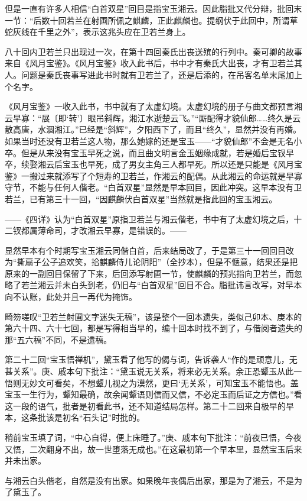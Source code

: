 \par 但是一直有许多人相信“白首双星”回目是指宝玉湘云。因此脂批又代分辩，批回末一节：“后数十回若兰在射圃所佩之麒麟，正此麒麟也。提纲伏于此回中，所谓草蛇灰线在千里之外”，表示这兆头应在卫若兰身上。
\par 八十回内卫若兰只出现过一次，在第十四回秦氏出丧送殡的行列中。秦可卿的故事来自《风月宝鉴》。《风月宝鉴》收入此书后，书中才有秦氏大出丧，才有卫若兰其人。问题是秦氏丧事写进此书时就有卫若兰了，还是后添的，在吊客名单末尾加上个名字。
\par 《风月宝鉴》一收入此书，书中就有了太虚幻境。太虚幻境的册子与曲文都预言湘云早寡：“展〔即‘转’〕眼吊斜辉，湘江水逝楚云飞。”“厮配得才貌仙郎……终久是云散高唐，水涸湘江。”已经是“斜辉”，夕阳西下了，而且“终久”，显然并没有再婚。如果当时还没有卫若兰这人物，那么她嫁的还是宝玉——“才貌仙郎”不会是无名小卒。但是从来没有宝玉早死之说，而且曲文明言金玉姻缘成就，若是婚后宝钗早卒，续娶湘云后宝玉也早死，成了男女主角三人都早死。所以还是只能是《风月宝鉴》一搬过来就添写了个短寿的卫若兰，作湘云的配偶。从此湘云的命运就是早寡守节，不能与任何人偕老。“白首双星”显然是早本回目，因此冲突。这早本没有卫若兰，已有第三十一回，“因麒麟伏白首双星”当然就是指此回的宝玉湘云。
\par ——《四详》认为“白首双星”原指卫若兰与湘云偕老，书中有了太虚幻境之后，十二钗都属薄命司，才改湘云早寡，是错误的。——
\par 显然早本有个时期写宝玉湘云同偕白首，后来结局改了，于是第三十一回回目改为“撕扇子公子追欢笑，拾麒麟侍儿论阴阳”（全抄本），但是不惬意，结果还是把原来的一副回目保留了下来，后回添写射圃一节，使麒麟的预兆指向卫若兰，而忽略了若兰湘云并未白头到老，仍旧与“白首双星”回目不合。脂批讳言改写，对早本向不认账，此处并且一再代为掩饰。
\par 畸笏嗟叹“卫若兰射圃文字迷失无稿”，该是整个一回本遗失，类似己卯本、庚本的第六十四、六十七回，都是写得相当早的，编十回本时找不到了，与借阅者遗失的那“五六稿”不同，不是遗稿。
\par 第二十二回“宝玉悟禅机”，黛玉看了他写的偈与词，告诉袭人“作的是顽意儿，无甚关系”。庚、戚本句下批注：“黛玉说无关系，将来必无关系。余正恐颦玉从此一悟则无妙文可看矣，不想颦儿视之为漠然，更曰‘无关系’，可知宝玉不能悟也。盖宝玉一生行为，颦知最确，故余闻颦语则信而又信，不必定玉而后证之方信也。”看这一段的语气，批者是初看此书，还不知道结局怎样。第二十二回来自极早的早本，这条批该是初名“石头记”时批的。
\par 稍前宝玉填了词，“中心自得，便上床睡了。”庚、戚本句下批注：“前夜已悟，今夜又悟，二次翻身不出，故一世堕落无成也。”在这最初第一个早本里，显然宝玉后来并未出家。
\par 与湘云白头偕老，自然是没有出家。如果晚年丧偶后出家，那是为了湘云，不是为了黛玉了。
